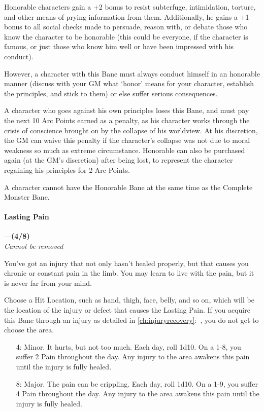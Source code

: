 \documentclass[oneside,11pt,english]{book}
\begin{document}
Honorable characters gain a +2 bonus to resist subterfuge, intimidation, torture, and other means of 
prying information from them. Additionally, he gains a +1 bonus to all social checks made to persuade, 
reason with, or debate those who know the character to be honorable (this could be everyone, if the 
character is famous, or just those who know him well or have been impressed with his conduct). 

However, a character with this Bane must always conduct himself in an honorable manner (discuss with 
your GM what ‘honor’ means for your character, establish the principles, and stick to them) or else suffer serious consequences. 

A character who goes against his own principles loses this Bane, and must pay the next 10 Arc Points 
earned as a penalty, as his character works through the crisis of conscience brought on by the collapse of 
his worldview. At his discretion, the GM can waive this penalty if the character's collapse was not due to 
moral weakness so much as extreme circumstance. Honorable can also be purchased again (at the GM's 
discretion) after being lost, to represent the character regaining his principles for 2 Arc Points. 

A character cannot have the Honorable Bane at the same time as the Complete Monster Bane. 
\paragraph{\label{bane:Lasting Pain}Lasting Pain}---\quad\textbf{(4/8) }\\
\emph{Cannot be removed}\par
You've got an injury that not only hasn't healed properly, but that causes you chronic or constant pain in the limb. You may learn to live with the pain, but it is never far from your mind.


Choose a Hit Location, such as hand, thigh, face, belly, and so on, which will be the location of the injury or defect that causes the Lasting Pain. If you acquire this Bane through an injury as detailed in \autoref{ch:injuryrecovery}:~, you do not get to choose the area. 
\begin{itemize}
\item [4:] Minor. It hurts, but not too much. Each day, roll 1d10. On a 1-8, you suffer 2 Pain throughout the day. Any injury to the area awakens this pain until the injury is fully healed. 
\item [8:] Major. The pain can be crippling. Each day, roll 1d10. On a 1-9, you suffer 4 Pain throughout the day. Any injury to the area awakens this pain until the injury is fully healed.
\end{itemize}
\end{document}
